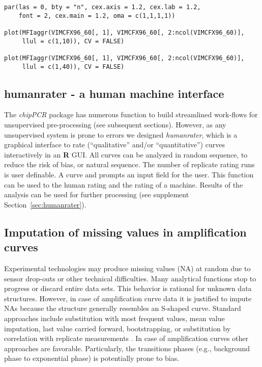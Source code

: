 \documentclass[twocolumn]{bmcart}%
\begin{document}
\begin{figure*}
\begin{verbatim}
par(las = 0, bty = "n", cex.axis = 1.2, cex.lab = 1.2, 
    font = 2, cex.main = 1.2, oma = c(1,1,1,1))

plot(MFIaggr(VIMCFX96_60[, 1], VIMCFX96_60[, 2:ncol(VIMCFX96_60)], 
     llul = c(1,10)), CV = FALSE)

plot(MFIaggr(VIMCFX96_60[, 1], VIMCFX96_60[, 2:ncol(VIMCFX96_60)], 
     llul = c(1,40)), CV = FALSE)
\end{verbatim}
\end{figure*}



\subsection*{humanrater - a human machine interface}

The \emph{chipPCR} package has numerous function to build streamlined work-flows 
for unsupervised pre-processing (see subsequent sections). However, as any 
unsupervised system is prone to errors we designed \textsl{humanrater}, which is 
a graphical interface to rate (``qualitative'' and/or ``quantitative'') curves 
interactively in an \textbf{R} GUI. All curves can be analyzed in random 
sequence, to reduce the risk of bias, or natural sequence. The number of 
replicate rating runs is user definable. A curve and prompts an input field for 
the user. This function can be used to the human rating and the rating of a 
machine. Results of the analysis can be used for further processing 
(see supplement Section~\ref{sec:humanrater}).

\subsection*{Imputation of missing values in amplification curves}

  Experimental technologies may produce missing values (NA) at 
random due to sensor drop-outs or other technical difficulties. Many analytical 
functions stop to progress or discard entire data sets. This 
behavior is rational for unknown data structures. However, in case of 
amplification curve data it is justified to impute NAs because the structure 
generally resembles an S-shaped curve. Standard approaches include substitution 
with most frequent values, mean value imputation, last value carried forward, 
bootstrapping, or substitution by correlation with replicate measurements 
\cite{Harrell_2001}. In case of amplification curves other approaches are 
favorable. Particularly, the transitions phases (e.g., background phase to 
exponential phase) is potentially prone to bias.
\end{document}
